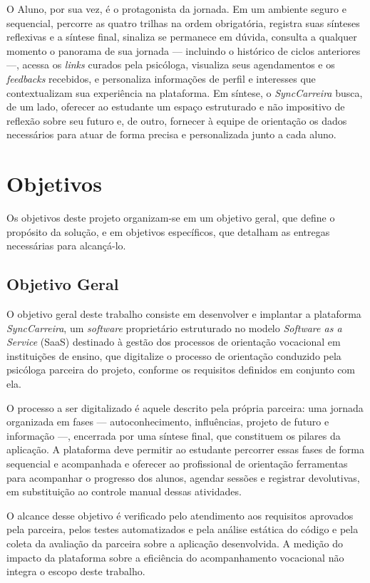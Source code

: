 O Aluno, por sua vez, é o protagonista da jornada. Em um ambiente seguro e sequencial, percorre as quatro trilhas na ordem obrigatória, registra suas sínteses reflexivas e a síntese final, sinaliza se permanece em dúvida, consulta a qualquer momento o panorama de sua jornada --- incluindo o histórico de ciclos anteriores ---, acessa os \textit{links} curados pela psicóloga, visualiza seus agendamentos e os \textit{feedbacks} recebidos, e personaliza informações de perfil e interesses que contextualizam sua experiência na plataforma. Em síntese, o \textit{SyncCarreira} busca, de um lado, oferecer ao estudante um espaço estruturado e não impositivo de reflexão sobre seu futuro e, de outro, fornecer à equipe de orientação os dados necessários para atuar de forma precisa e personalizada junto a cada aluno.

\section{Objetivos}\label{sec:objetivos}

Os objetivos deste projeto organizam-se em um objetivo geral, que define o propósito da solução, e em objetivos específicos, que detalham as entregas necessárias para alcançá-lo.

\subsection{Objetivo Geral}

O objetivo geral deste trabalho consiste em desenvolver e implantar a plataforma \textit{SyncCarreira}, um \textit{software} proprietário estruturado no modelo \textit{Software as a Service} (SaaS) destinado à gestão dos processos de orientação vocacional em instituições de ensino, que digitalize o processo de orientação conduzido pela psicóloga parceira do projeto, conforme os requisitos definidos em conjunto com ela.

O processo a ser digitalizado é aquele descrito pela própria parceira: uma jornada organizada em fases --- autoconhecimento, influências, projeto de futuro e informação ---, encerrada por uma síntese final, que constituem os pilares da aplicação. A plataforma deve permitir ao estudante percorrer essas fases de forma sequencial e acompanhada e oferecer ao profissional de orientação ferramentas para acompanhar o progresso dos alunos, agendar sessões e registrar devolutivas, em substituição ao controle manual dessas atividades.

O alcance desse objetivo é verificado pelo atendimento aos requisitos aprovados pela parceira, pelos testes automatizados e pela análise estática do código e pela coleta da avaliação da parceira sobre a aplicação desenvolvida. A medição do impacto da plataforma sobre a eficiência do acompanhamento vocacional não integra o escopo deste trabalho.

